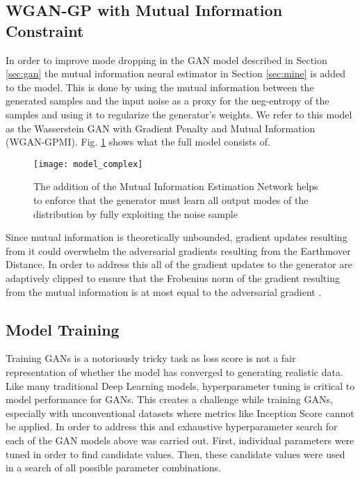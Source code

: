 \subsection{WGAN-GP with Mutual Information Constraint}
\label{sec:gpmi}

In order to improve mode dropping in the GAN model described in Section \ref{sec:gan} the mutual information neural estimator in Section \ref{sec:mine} is added to the model. This is done by using the mutual information between the generated samples and the input noise as a proxy for the neg-entropy of the samples and using it to regularize the generator's weights. We refer to this model as the Wasserstein GAN with Gradient Penalty and Mutual Information (WGAN-GPMI). Fig. \ref{fig:model_complex} shows what the full model consists of. 

\begin{figure}[!htbp]
	\centering%
	\texttt{[image: model\_complex]}
	\caption{
		The addition of the Mutual Information Estimation Network helps to enforce that the generator must learn all output modes of the distribution by fully exploiting the noise sample
	}
	\label{fig:model_complex}
\end{figure}

Since mutual information is theoretically unbounded, gradient updates resulting from it could overwhelm the adversarial gradients resulting from the Earthmover Distance. In order to address this all of the gradient updates to the generator are adaptively clipped to ensure that the Frobenius norm of the gradient resulting from the mutual information is at most equal to the adversarial gradient \cite{Belghazi2018}.


\subsection{Model Training}
\label{sec:training}

Training GANs is a notoriously tricky task as loss score is not a fair representation of whether the model has converged to generating realistic data. Like many traditional Deep Learning models, hyperparameter tuning is critical to model performance for GANs. This creates a challenge while training GANs, especially with unconventional datasets where metrics like Inception Score cannot be applied. In order to address this and exhaustive hyperparameter search for each of the GAN models above was carried out. First, individual parameters were tuned in order to find candidate values. Then, these candidate values were used in a search of all possible parameter combinations.

